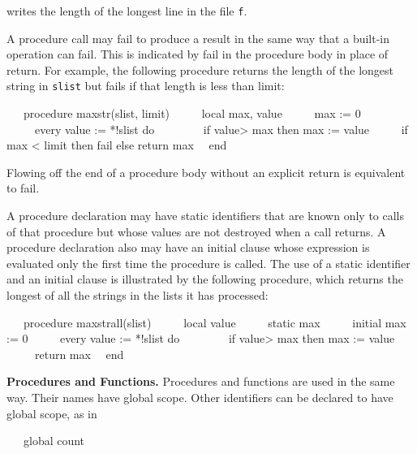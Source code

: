 \noindent
writes the length of the longest line in the file \texttt{f}.

A procedure call may fail to produce a result in the same way that a
built-in operation can fail. This is indicated by fail in the
procedure body in place of return. For example, the following
procedure returns the length of the longest string in \texttt{slist}
but fails if that length is less than limit:

{\ttfamily\mdseries
\ \ \ procedure maxstr(slist, limit)\newline
 \ \ \ \ \ local max, value\newline
 \ \ \ \ \ max := 0\newline
 \ \ \ \ \ every value := *!slist do\newline
 \ \ \ \ \ \ \ \ if value{\textgreater} max then max := value\newline
 \ \ \ \ \ if max {\textless} limit then fail else return max\newline
 \ \ end}

Flowing off the end of a procedure body without an explicit return is
equivalent to fail.

A procedure declaration may have static identifiers that are known
only to calls of that procedure but whose values are not destroyed
when a call returns. A procedure declaration also may have an initial
clause whose expression is evaluated only the first time the procedure
is called. The use of a static identifier and an initial clause is
illustrated by the following procedure, which returns the longest of
all the strings in the lists it has processed:

{\ttfamily\mdseries
\ \ \ procedure maxstrall(slist)\newline
 \ \ \ \ \ local value\newline
 \ \ \ \ \ static max\newline
 \ \ \ \ \ initial max := 0\newline
 \ \ \ \ \ every value := *!slist do\newline
 \ \ \ \ \ \ \ \ if value{\textgreater} max then max := value\newline
 \ \ \ \ \ return max\newline
 \ \ end}

\textbf{Procedures and Functions.} Procedures and functions are used
in the same way. Their names have global scope.  Other identifiers can
be declared to have global scope, as in

{\ttfamily\mdseries
\ \ \ global count}

